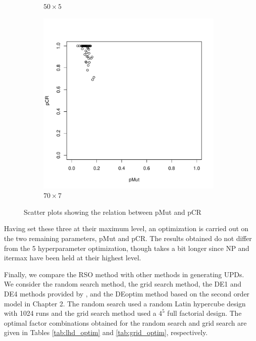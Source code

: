 \documentclass [PhD] {package/uclathes}
\begin{document}
\begin{figure}
\begin{subfigure}[b]{0.3\textwidth}
\caption{$50\times 5$}
\end{subfigure}
\begin{subfigure}[b]{0.3\textwidth}
\includegraphics{chapters/RSO/pdfs/scatter70}
\caption{$70\times 7$}
\end{subfigure}
\caption{Scatter plots showing the relation between pMut and pCR}
\label{fig:scatter}
\end{figure}

Having set these three at their maximum level, an optimization is carried out on the two remaining parameters, pMut and pCR. The results obtained do not differ from the 5 hyperparameter optimization, though takes a bit longer since NP and itermax have been held at their highest level.

Finally, we compare the RSO method with other methods in generating UPDs.
We consider the random search method, the grid search method, the DE1 and DE4 methods provided by \textcite{stokes2023metaheuristic}, and the DEoptim method based on the second order model in Chapter 2. The random search used a random Latin hypercube design with 1024 runs and the grid search method used a $4^5$ full factorial design. The optimal factor combinations obtained for the random search and grid search are given in Tables \ref{tab:lhd_optim} and \ref{tab:grid_optim}, respectively.
\end{document}
